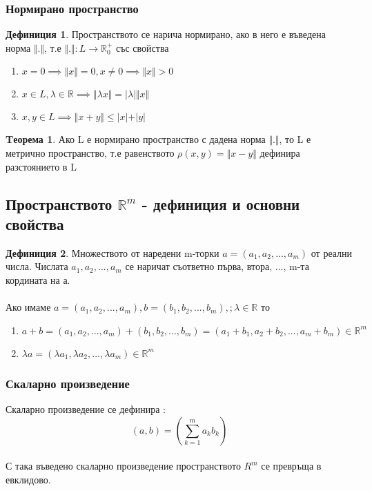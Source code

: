 \documentclass[a4paper,fleqn,12pt]{article}
\theoremstyle{definition}
\newtheorem{theorem}{Tеорема}[subsection]
\newtheorem{definition}{Дефиниция}[subsection]
\begin{document}
\subsubsection{Нормирано пространство}
\begin{definition}
Пространството се нарича нормирано, ако в него е въведена норма $\Vert. \Vert$, т.е $\Vert.\Vert: L \to \mathbb{R}_0^+$ със свойства 
	\begin{enumerate}
 		\item $x = 0  \implies \Vert x \Vert = 0, x \neq 0  \implies \Vert x\Vert > 0$
		\item $x \in L, \lambda \in \mathbb{R} \implies \Vert \lambda x \Vert = \vert \lambda\vert   \Vert x \Vert$
		\item $x,y \in L \implies \Vert x+y\Vert \leq \vert x\vert  + \vert y\vert $
	\end{enumerate}
\end{definition}
\begin{theorem}
Ако L е нормирано пространство с дадена норма $\Vert . \Vert$, то L е метрично пространство, т.е равенството $\rho(x,y) = \Vert x - y \Vert$ дефинира  разстоянието в L
\end{theorem}

\subsection{Пространството $\mathbb{R}^m$ - дефиниция и основни свойства}

\begin{definition}
Множеството от наредени m-торки $a = (a_1, a_2, ... , a_m)$ от реални числа. Числата $a_1, a_2, ... , a_m$ се наричат съответно първа, втора, ..., m-та кордината на а.\\
\\
 Ако имаме $a = (a_1, a_2, ... , a_m), b = (b_1, b_2, ... , b_m), ; \lambda \in \mathbb{R} $ то
	\begin{enumerate}
		\item $a+b =(a_1, a_2, ... , a_m) +  (b_1, b_2, ... , b_m) = (a_1 + b_1, a_2+b_2, ... , a_m + b_m) \in \mathbb{R}^m$
		\item $ \lambda a =(\lambda a_1,\lambda a_2, ... , \lambda a_m) \in \mathbb{R}^m $\\
	\end{enumerate}
\end{definition}

\subsubsection{Скаларно произведение}
Скаларно произведение се дефинира : $$ (a,b) = \left( \sum_{k=1}^{m}a_kb_k \right )$$\\
С така въведено скаларно произведение пространството $R^m$ се превръща в евклидово.
\end{document}
